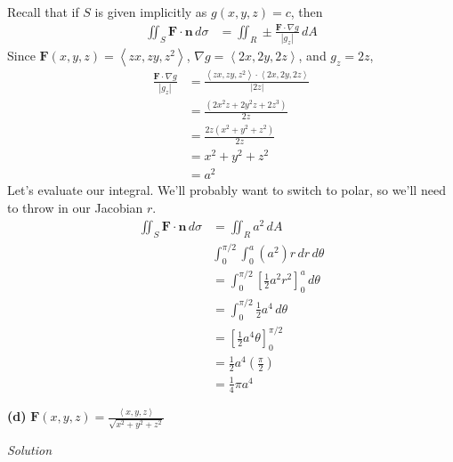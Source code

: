 \documentclass{article}
\newcommand{\lrp}[1]{\left( #1 \right)}
\newcommand{\lra}[1]{\left\langle #1 \right\rangle}
\newcommand{\lrb}[1]{\left[ #1 \right]}
\newcommand{\F}[0]{\mathbf{F}}
\newcommand{\n}[0]{\mathbf{n}}
\newcommand{\Solution}{\textit{Solution}}
\begin{document}
Recall that if $S$ is given implicitly as $g(x,y,z)=c$, then
\begin{align*}
    \iint_S \F\cdot \n \,d\sigma &= \iint_R \pm \frac{\F\cdot \nabla g}{\left|g_z\right|}\,dA
\end{align*}
Since $\F(x,y,z)=\lra{zx,zy,z^2}$, $\nabla g = \lra{2x,2y,2z}$, and $g_z=2z$,
\begin{align*}
    \frac{ \F \cdot \nabla g}{\left|g_z\right|}&=\frac{ \lra{zx,zy,z^2}\cdot \lra{2x,2y,2z}}{\left|2z\right|}\\
    &=\frac{ \lrp{2x^2z+2y^2z+2z^3}}{2z}\tag{we're in first octant}\\
    &=\frac{2z(x^2+y^2+z^2)}{2z}\\
    &= x^2+y^2+z^2\\
    &=a^2\tag{$x^2+y^2+z^2=a^2$}
\end{align*}
Let's evaluate our integral. We'll probably want to switch to polar, so we'll need to throw in our Jacobian $r$.
\begin{align*}
 \iint_S \F\cdot \n\,d\sigma   &=\iint_R a^2\,dA\\
    &\int_0^{\pi/2}\int_0^a \lrp{a^2}r\,dr\,d\theta\\
    &=\int_0^{\pi/2}\lrb{\frac{1}{2}a^2r^2}_0^a\,d\theta\\
    &=\int_0^{\pi/2}\frac{1}{2}a^4\,d\theta\\
    &=\lrb{\frac{1}{2}a^4\theta}_0^{\pi/2}\\
    &=\frac{1}{2}a^4\lrp{\frac{\pi}{2}}\\
    &=\boxed{\frac{1}{4}\pi a^4}
\end{align*}

{}\textbf{(d)} $\displaystyle \F(x,y,z)=\frac{\lra{x,y,z}}{\sqrt{x^2+y^2+z^2}}$

\Solution
\end{document}
